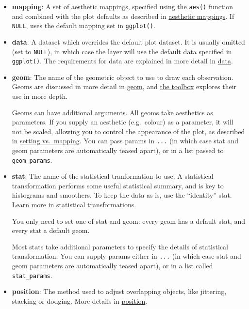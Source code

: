 \begin{itemize}
\item
  \textbf{mapping}: A set of aesthetic mappings, specified using the
  \texttt{aes()} function and combined with the plot defaults as
  described in \protect\hyperlink{sec:aes}{aesthetic mappings}. If
  \texttt{NULL}, uses the default mapping set in \texttt{ggplot()}.
\item
  \textbf{data}: A dataset which overrides the default plot dataset. It
  is usually omitted (set to \texttt{NULL}), in which case the layer
  will use the default data specified in \texttt{ggplot()}. The
  requirements for data are explained in more detail in
  \protect\hyperlink{sec:data}{data}.
\item
  \textbf{geom}: The name of the geometric object to use to draw each
  observation. Geoms are discussed in more detail in
  \protect\hyperlink{sec:data}{geom}, and
  \protect\hyperlink{cha:toolbox}{the toolbox} explores their use in
  more depth.

  Geoms can have additional arguments. All geoms take aesthetics as
  parameters. If you supply an aesthetic (e.g.~colour) as a parameter,
  it will not be scaled, allowing you to control the appearance of the
  plot, as described in \protect\hyperlink{sub:setting-mapping}{setting
  vs.~mapping}. You can pass params in \texttt{...} (in which case stat
  and geom parameters are automatically teased apart), or in a list
  passed to \texttt{geom\_params}.
\item
  \textbf{stat}: The name of the statistical tranformation to use. A
  statistical transformation performs some useful statistical summary,
  and is key to histograms and smoothers. To keep the data as is, use
  the ``identity'' stat. Learn more in
  \protect\hyperlink{sec:stat}{statistical transformations}.

  You only need to set one of stat and geom: every geom has a default
  stat, and every stat a default geom.

  Most stats take additional parameters to specify the details of
  statistical transformation. You can supply params either in
  \texttt{...} (in which case stat and geom parameters are automatically
  teased apart), or in a list called \texttt{stat\_params}.
\item
  \textbf{position}: The method used to adjust overlapping objects, like
  jittering, stacking or dodging. More details in
  \protect\hyperlink{sec:position}{position}.
\end{itemize}

